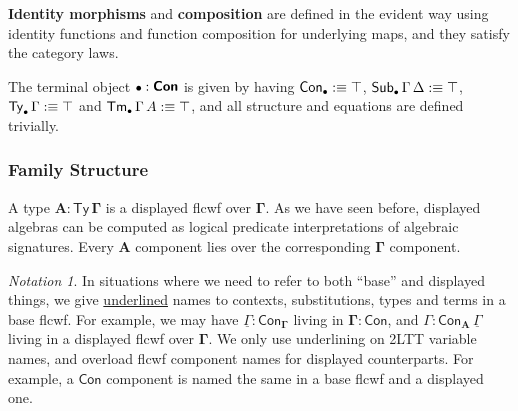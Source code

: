 \documentclass[12pt,a4paper,twoside,openany]{book}
\theoremstyle{remark}
\newtheorem{notation}{Notation}
\theoremstyle{definition}
\theoremstyle{theorem}
\newcommand{\Con}{\mathsf{Con}}
\newcommand{\Sub}{\mathsf{Sub}}
\newcommand{\Tm}{\mathsf{Tm}}
\newcommand{\Ty}{\mathsf{Ty}}
\newcommand{\bCon}{\boldsymbol{\Con}}
\newcommand{\bTy}{\boldsymbol{\Ty}}
\newcommand{\bGamma}{\boldsymbol{\Gamma}}
\newcommand{\bA}{\boldsymbol{A}}
\newcommand{\bemptycon}{\scaleobj{.75}{\boldsymbol{\bullet}}}
\newcommand{\ul}[1]{\underline{#1}}
\newcommand{\ulGamma}{\ul{\Gamma}}
\newcommand{\defn}{:\equiv}
\begin{document}
\textbf{Identity morphisms} and \textbf{composition} are defined in the evident
way using identity functions and function composition for underlying maps, and
they satisfy the category laws.

The terminal object $\bemptycon:\bCon$ is given by having $\Con_{\bemptycon} \defn
\top$, $\Sub_{\bemptycon}\,\Gamma\,\Delta \defn \top$, $\Ty_{\bemptycon}\,\Gamma \defn \top$ and
$\Tm_{\bemptycon}\,\Gamma\,A \defn \top$, and all structure and equations are defined trivially.

\subsubsection{Family Structure}

A type $\bA : \bTy\,\bGamma$ is a displayed flcwf over $\bGamma$.  As we have
seen before, displayed algebras can be computed as logical predicate
interpretations of algebraic signatures. Every $\bA$ component lies over the
corresponding $\bGamma$ component.

\begin{notation} In situations where we need to refer to both ``base'' and
displayed things, we give \ul{underlined} names to contexts, substitutions,
types and terms in a base flcwf. For example, we may have $\ulGamma :
\Con_{\bGamma}$ living in $\boldsymbol{\Gamma : \Con}$, and $\Gamma :
\Con_{\bA}\,\ulGamma$ living in a displayed flcwf over $\bGamma$. We only use
underlining on 2LTT variable names, and overload flcwf component names for
displayed counterparts. For example, a $\Con$ component is named the same in
a base flcwf and a displayed one.
\end{notation}
\end{document}

